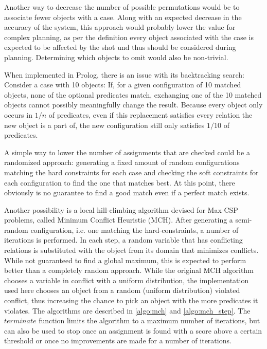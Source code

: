 Another way to decrease the number of possible permutations would be to associate fewer objects with a case. Along with an expected decrease in the accuracy of the system, this approach would probably lower the value for complex planning, as per the definition every object associated with the case is expected to be affected by the shot und thus should be considered during planning.
Determining which objects to omit would also be non-trivial.

When implemented in Prolog, there is an issue with its backtracking search: Consider a case with 10 objects: If, for a given configuration of 10 matched objects, none of the optional predicates match, exchanging one of the 10 matched objects cannot possibly meaningfully change the result.
Because every object only occurs in $1/n$ of predicates, even if this replacement satisfies every relation the new object is a part of, the new configuration still only satisfies $1/10$ of predicates.

A simple way to lower the number of assignments that are checked could be a randomized approach: generating a fixed amount of random configurations matching the hard constraints for each case and checking the soft constraints for each configuration to find the one that matches best.
At this point, there obviously is no guarantee to find a good match even if a perfect match exists.

Another possibility is a local hill-climbing algorithm devised for Max-CSP problems, called Minimum Conflict Heuristic (MCH)\cite{Minton1992MinimizingCA}. After generating a semi-random configuration, i.e. one matching the hard-constraints, a number of iterations is performed. In each step, a random variable that has conflicting relations is substituted with the object from its domain that minimizes conflicts. While not guaranteed to find a global maximum, this is expected to perform better than a completely random approach.
While the original MCH algorithm chooses a variable in conflict with a uniform distribution, the implementation used here chooses an object from a random (uniform distribution) violated conflict, thus increasing the chance to pick an object with the more predicates it violates. The algorithms are described in \ref{algo:mch} and \ref{algo:mch_step}.
The $terminate$ function limits the algorithm to a maximum number of iterations, but can also be used to stop once an assignment is found with a score above a certain threshold or once no improvements are made for a number of iterations.

